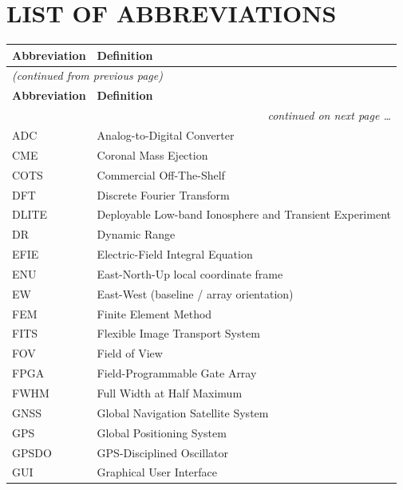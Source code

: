 \chapter*{LIST OF ABBREVIATIONS}

{ %
\renewcommand{\arraystretch}{1.3}
\begin{longtable}{@{} p{3.2cm} p{12.3cm} @{}}
\toprule
\textbf{Abbreviation} & \textbf{Definition} \\
\midrule
\endfirsthead
\multicolumn{2}{l}{\textit{(continued from previous page)}} \\
\toprule
\textbf{Abbreviation} & \textbf{Definition} \\
\midrule
\endhead
\midrule
\multicolumn{2}{r}{\textit{continued on next page \ldots}} \\
\endfoot
\bottomrule
\endlastfoot
ADC      & Analog-to-Digital Converter \\
CME      & Coronal Mass Ejection \\
COTS     & Commercial Off-The-Shelf \\
DFT      & Discrete Fourier Transform \\
DLITE    & Deployable Low-band Ionosphere and Transient Experiment \\
DR       & Dynamic Range \\
EFIE     & Electric-Field Integral Equation \\
ENU      & East-North-Up local coordinate frame \\
EW       & East-West (baseline / array orientation) \\
FEM      & Finite Element Method \\
FITS     & Flexible Image Transport System \\
FOV      & Field of View \\
FPGA     & Field-Programmable Gate Array \\
FWHM     & Full Width at Half Maximum \\
GNSS     & Global Navigation Satellite System \\
GPS      & Global Positioning System \\
GPSDO    & GPS-Disciplined Oscillator \\
GUI      & Graphical User Interface \\

\end{longtable}}
